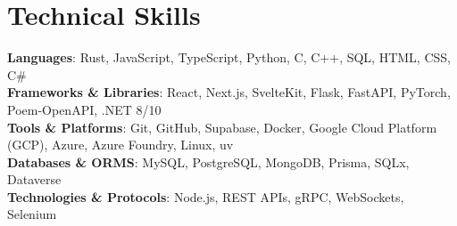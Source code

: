 \documentclass[letterpaper,8pt]{article}
\begin{document}
\section{Technical Skills}
\begin{itemize}[leftmargin=0.15in, label={}]
  \small{\item{
        \textbf{Languages}: Rust, JavaScript, TypeScript, Python, C, C++, SQL, HTML, CSS, C\# \\
        \textbf{Frameworks \& Libraries}: React, Next.js, SvelteKit, Flask, FastAPI, PyTorch, Poem-OpenAPI, .NET 8/10 \\
        \textbf{Tools \& Platforms}: Git, GitHub, Supabase, Docker, Google Cloud Platform (GCP), Azure, Azure Foundry, Linux, uv \\
        \textbf{Databases \& ORMS}: MySQL, PostgreSQL, MongoDB, Prisma, SQLx, Dataverse\\
        \textbf{Technologies \& Protocols}: Node.js, REST APIs, gRPC, WebSockets, Selenium}}
\end{itemize}

\end{document}
